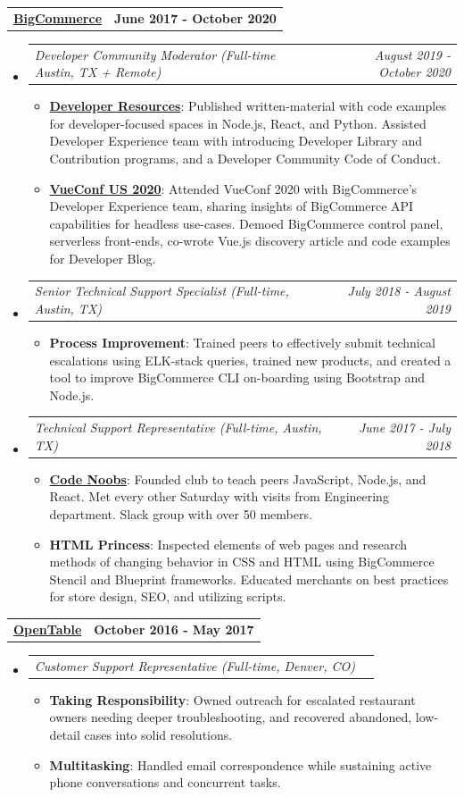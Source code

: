\documentclass[letterpaper,10.8pt]{article}
\makeatletter
\newcommand{\resumeItem}[2]{
  \item\small{
    \textbf{#1}{: #2 \vspace{-2pt}}
  }
}
\newcommand{\jobLineItem}[2]{
  \vspace{0pt}\item[]
    \begin{tabular*}{0.98\textwidth}{l@{\extracolsep{\fill}}r}
      \textit{#1} & \textit{\small #2} \\
    \end{tabular*}\vspace{-4pt}
}
\newcommand{\employerTitle}[3]{
  \begin{tabular*}{1\textwidth}{l@{\extracolsep{\fill}}r}
    \href{#1}{\textbf{#2}} & \textbf{#3} \\
  \end{tabular*}\vspace{-4pt}
}
\newcommand{\resumeSubHeadingListStart}{\begin{itemize}[leftmargin=*]}
\newcommand{\resumeSubHeadingListEnd}{\end{itemize}}
\newcommand{\resumeItemListStart}{\begin{itemize}}
\newcommand{\resumeItemListEnd}{\end{itemize}\vspace{-5pt}}
\makeatother
\begin{document}
  \employerTitle
    {https://bigcommerce.com}{BigCommerce}{June 2017 - October 2020}
  \resumeSubHeadingListStart
    \jobLineItem
        {Developer Community Moderator (Full-time Austin, TX + Remote)}{August 2019 - October 2020}
    \resumeItemListStart
        \resumeItem{\href{https://bigcommerce.github.io/dev-library/}{Developer Resources}}{Published written-material with code examples for developer-focused spaces in Node.js, React, and Python. Assisted Developer Experience team with introducing Developer Library and Contribution programs, and a Developer Community Code of Conduct.}
        \resumeItem{\href{https://medium.com/bigcommerce-developer-blog/introduction-to-vue-js-bigcommerce-b4388a2da4d2}{VueConf US 2020}}{Attended VueConf 2020 with BigCommerce’s Developer Experience team, sharing insights of BigCommerce API capabilities for headless use-cases. Demoed BigCommerce control panel, serverless front-ends, co-wrote Vue.js discovery article and code examples for Developer Blog.}
    \resumeItemListEnd
    \jobLineItem
        {Senior Technical Support Specialist (Full-time, Austin, TX)}{July 2018 - August 2019}
    \resumeItemListStart
        \resumeItem{Process Improvement}
        {Trained peers to effectively submit technical escalations using ELK-stack queries, trained new products, and created a tool to improve BigCommerce CLI on-boarding using Bootstrap and Node.js.}
      \resumeItemListEnd
    \jobLineItem
		    {Technical Support Representative (Full-time, Austin, TX)}{June 2017 - July 2018}
        \resumeItemListStart
        \resumeItem{\href{https://github.com/obrien-k/code-noobs-slackbot}{Code Noobs}}{Founded club to teach peers JavaScript, Node.js, and React. Met every other Saturday with visits from Engineering department. Slack group with over 50 members.}
        \resumeItem{HTML Princess}{Inspected elements of web pages and research methods of changing behavior in CSS and HTML using BigCommerce Stencil and Blueprint frameworks. Educated merchants on best practices for store design, SEO, and utilizing scripts.}
      \resumeItemListEnd
    \resumeSubHeadingListEnd

  \newpage
  \employerTitle
    {https://www.opentable.com}{OpenTable}{October 2016 - May 2017}
  \resumeSubHeadingListStart
    \jobLineItem
      {Customer Support Representative (Full-time, Denver, CO)}{}
      \resumeItemListStart
        \resumeItem{Taking Responsibility}{Owned outreach for escalated restaurant owners needing deeper troubleshooting, and recovered abandoned, low-detail cases into solid resolutions.}
        \resumeItem{Multitasking}{Handled email correspondence while sustaining active phone conversations and concurrent tasks.}
      \resumeItemListEnd
  \resumeSubHeadingListEnd
\end{document}
